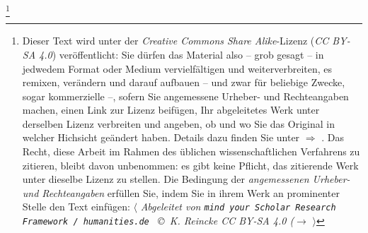 %
%
%

\footnote{Dieser Text wird unter der \textit{Creative Commons Share
Alike}-Lizenz (\textit{CC BY-SA 4.0}) veröffentlicht: Sie dürfen das Material
also -- grob gesagt -- in jedwedem Format oder Medium vervielfältigen und
weiterverbreiten, es remixen, verändern und darauf aufbauen -- und zwar für
beliebige Zwecke, sogar kommerzielle --, sofern Sie angemessene Urheber- und
Rechteangaben machen, einen Link zur Lizenz beifügen, Ihr abgeleitetes Werk
unter derselben Lizenz verbreiten und angeben, ob und wo Sie das Original in
welcher Hichsicht geändert haben. Details dazu finden Sie unter $\Rightarrow$
.
Das Recht, diese Arbeit im Rahmen des üblichen wissenschaftlichen Verfahrens zu
zitieren, bleibt davon unbenommen: es gibt keine Pflicht, das zitierende Werk
unter dieselbe Lizenz zu stellen. Die Bedingung der \textit{an\-ge\-mes\-se\-nen
Urheber- und Rechteangaben} erfüllen Sie, indem Sie in ihrem Werk an prominenter
Stelle den Text einfügen: $\langle$ {\itshape Abgeleitet von \texttt{mind your
Scholar Research Framework / humanities.de } \copyright\ K. Reincke CC BY-SA 4.0
($\rightarrow$
 }
$\rangle$ }

